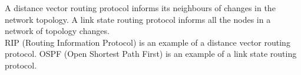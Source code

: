A distance vector routing protocol informs its neighbours of changes in the network topology. A link state routing protocol informs all the nodes in a network of topology changes. \\
RIP (Routing Information Protocol) is an example of a distance vector routing protocol. OSPF (Open Shortest Path First) is an example of a link state routing protocol.